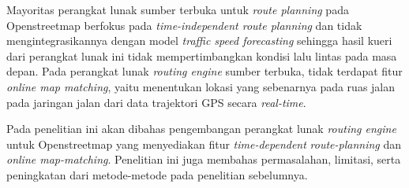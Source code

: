Mayoritas perangkat lunak sumber terbuka untuk \textit{route planning} pada Openstreetmap berfokus pada \textit{time-independent route planning} dan tidak mengintegrasikannya dengan model \textit{traffic speed forecasting} sehingga hasil kueri dari perangkat lunak ini tidak mempertimbangkan kondisi lalu lintas pada masa depan. Pada perangkat lunak \textit{routing engine} sumber terbuka, tidak terdapat fitur \textit{online map matching}, yaitu menentukan lokasi yang sebenarnya pada ruas jalan pada jaringan jalan dari data trajektori GPS secara \textit{real-time}.

Pada penelitian ini akan dibahas pengembangan perangkat lunak \textit{routing engine} untuk Openstreetmap yang menyediakan fitur \textit{time-dependent} \textit{route-planning} dan \textit{online map-matching}. Penelitian ini juga membahas permasalahan, limitasi, serta peningkatan dari metode-metode pada penelitian sebelumnya.


